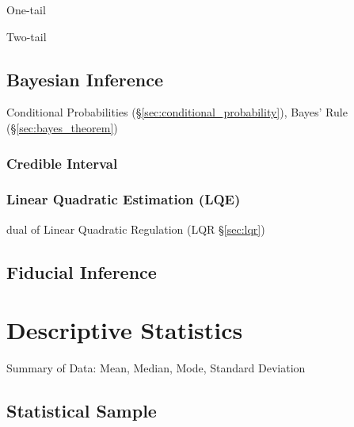 One-tail

Two-tail



\subsection{Bayesian Inference}\label{sec:bayesian_inference}

Conditional Probabilities (\S\ref{sec:conditional_probability}), Bayes' Rule
(\S\ref{sec:bayes_theorem})



\subsubsection{Credible Interval}\label{sec:credible_interval}

\subsubsection{Linear Quadratic Estimation (LQE)}\label{sec:lqe}

dual of Linear Quadratic Regulation (LQR \S\ref{sec:lqr})



\subsection{Fiducial Inference}\label{sec:fiducial_inference}



\section{Descriptive Statistics}\label{sec:descriptive_statistics}

Summary of Data: Mean, Median, Mode, Standard Deviation



\subsection{Statistical Sample}\label{sec:statistical_sample}

